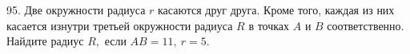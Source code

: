 95. Две окружности радиуса $r$ касаются друг друга. Кроме того, каждая из них касается изнутри третьей окружности радиуса $R$ в точках $A$ и $B$ соответственно. Найдите радиус $R,$ если $AB=11,\ r=5.$\\
